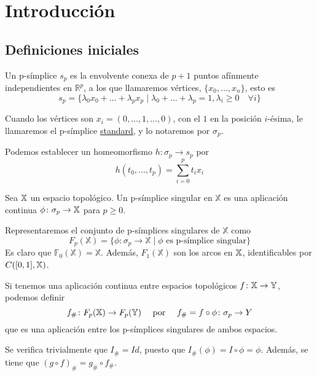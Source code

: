 \chapter{Introducción}\label{ch:introduccion}

\section{Definiciones iniciales}

\begin{definition}
Un p-símplice $s_p$ es la envolvente conexa de $p+1$ puntos afínmente independientes en $\mathbb{R}^p$,
a los que llamaremos vértices, $\{x_0, \dots, x_n\}$, esto es
\[ s_p = \{\lambda_0 x_0 + \dots + \lambda_p x_p \mid \lambda_0 + \dots + \lambda_p = 1, \lambda_i \geq 0 \quad \forall i \} \]
\end{definition}
Cuando los vértices son $x_i = (0, \dots, 1, \dots, 0)$, con el $1$ en la posición $i$-ésima, le llamaremos el p-símplice \underline{standard},
y lo notaremos por $\sigma_p$.

Podemos establecer un homeomorfismo $h \colon \sigma_p \to s_p$ por
\[ h(t_0, \dots, t_p) = \sum\limits_{i = 0}^p t_i x_i \]

\begin{definition}
Sea ${\mathbb X}$ un espacio topológico. Un p-símplice singular en $\mathbb{X}$ es una aplicación continua $\phi \colon \sigma_p \to {\mathbb X}$ para $p \geq 0$.
\end{definition}

Representaremos el conjunto de p-símplices singulares de $\mathbb{X}$ como
\[F_p(\mathbb{X}) = \{\phi \colon \sigma_p \to \mathbb{X} \mid \phi \text{ es p-símplice singular}\}\]
Es claro que $\mathbb{F}_0(\mathbb{X}) = \mathbb{X}$. Además, $F_1(\mathbb{X})$ son los arcos en ${\mathbb X}$, identificables por
$\mathbb \mathcal{C}([0,1], {\mathbb X})$.

Si tenemos una aplicación continua entre espacios topológicos $f \colon {\mathbb X} \to {\mathbb Y}$, podemos definir
\[f_{\#} \colon F_{p}({\mathbb X}) \to F_{p}({\mathbb Y})  \quad \text{ por }  \quad f_{\#} = f \circ \phi \colon \sigma_p \to Y \]
que es una aplicación entre los p-símplices singulares de ambos espacios.

Se verifica trivialmente que $I_\# = Id$, puesto que $I_\#(\phi) = I \circ \phi = \phi$.
Además, se tiene que $(g \circ f)_\# = g_\# \circ f_\#$.

